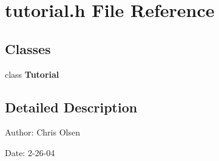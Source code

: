 \section{tutorial.h File Reference}
\label{tutorial_8h}
\subsection*{Classes}
\begin{CompactItemize}
\item 
class \bf{Tutorial}
\end{CompactItemize}


\subsection{Detailed Description}
\begin{Desc}
\item[Author:]Chris Olsen \end{Desc}
\begin{Desc}
\item[Date:]2-26-04 \end{Desc}
